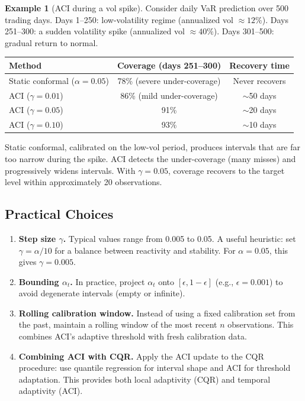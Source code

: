\documentclass[11pt, a4paper]{article}
\theoremstyle{definition}
\newtheorem{example}{Example}[section]
\theoremstyle{plain}
\theoremstyle{remark}
\begin{document}
\begin{example}[ACI during a vol spike]\label{ex:aci-vol-spike}
Consider daily VaR prediction over 500 trading days.
Days 1--250: low-volatility regime (annualized vol $\approx 12\%$).
Days 251--300: a sudden volatility spike (annualized vol $\approx 40\%$).
Days 301--500: gradual return to normal.

\begin{center}
\begin{tabular}{@{}lcc@{}}
\toprule
\textbf{Method} & \textbf{Coverage (days 251--300)} & \textbf{Recovery time} \\
\midrule
Static conformal ($\alpha = 0.05$) & 78\% (severe under-coverage) & Never recovers \\
ACI ($\gamma = 0.01$)             & 86\% (mild under-coverage)   & $\sim$50 days \\
ACI ($\gamma = 0.05$)             & 91\%                         & $\sim$20 days \\
ACI ($\gamma = 0.10$)             & 93\%                         & $\sim$10 days \\
\bottomrule
\end{tabular}
\end{center}

Static conformal, calibrated on the low-vol period, produces intervals that are
far too narrow during the spike.
ACI detects the under-coverage (many misses) and progressively widens intervals.
With $\gamma = 0.05$, coverage recovers to the target level within approximately
20 observations.
\end{example}

\subsection{Practical Choices}

\begin{enumerate}
    \item \textbf{Step size $\gamma$.}
          Typical values range from 0.005 to 0.05.
          A useful heuristic: set $\gamma = \alpha / 10$ for a balance between
          reactivity and stability.
          For $\alpha = 0.05$, this gives $\gamma = 0.005$.

    \item \textbf{Bounding $\alpha_t$.}
          In practice, project $\alpha_t$ onto $[\epsilon, 1 - \epsilon]$ (e.g.,
          $\epsilon = 0.001$) to avoid degenerate intervals (empty or infinite).

    \item \textbf{Rolling calibration window.}
          Instead of using a fixed calibration set from the past, maintain a
          rolling window of the most recent $n$ observations.
          This combines ACI's adaptive threshold with fresh calibration data.

    \item \textbf{Combining ACI with CQR.}
          Apply the ACI update to the CQR procedure: use quantile regression for
          interval shape and ACI for threshold adaptation.
          This provides both local adaptivity (CQR) and temporal adaptivity (ACI).
\end{enumerate}
\end{document}
